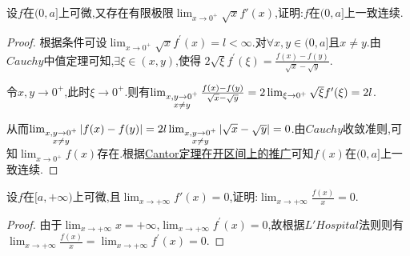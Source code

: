 \documentclass[lang=cn,newtx,10pt,scheme=chinese]{../Template/elegantbook}
\begin{document}
\begin{exercise}
    设\(f\)在\((0,a]\)上可微,又存在有限极限\(\lim_{x \to 0^+} \sqrt{x}f'(x)\),证明:\(f\)在\((0,a]\)上一致连续.
\end{exercise}
\begin{proof}
    根据条件可设\(\lim_{x\rightarrow 0^+} \sqrt{x}f^{\prime}(x)=l<\infty\).对\(\forall x,y\in (0,a]\)且\(x\neq y\).由\(Cauchy\)中值定理可知,\(\exists \xi \in (x,y)\),使得
\(2\sqrt{\xi}f^{\prime}(\xi)=\frac{f(x) - f(y)}{\sqrt{x}-\sqrt{y}}\).

令\(x,y\rightarrow 0^+ \),此时\(\xi \rightarrow 0^+\).则有\(\lim_{\begin{subarray}{c}
x,y\rightarrow 0^+\\
x\neq y
\end{subarray}} \frac{f(x) - f(y)}{\sqrt{x}-\sqrt{y}}=2\lim_{\xi \rightarrow 0^+} \sqrt{\xi}f^{\prime}(\xi)=2l\).

从而\(\lim_{\begin{subarray}{c}
x,y\rightarrow 0^+\\
x\neq y
\end{subarray}} \vert f(x) - f(y)\vert = 2l\lim_{\begin{subarray}{c}
x,y\rightarrow 0^+\\
x\neq y
\end{subarray}} \vert\sqrt{x}-\sqrt{y}\vert = 0\).由\(Cauchy\)收敛准则,可知\(\lim_{x\rightarrow 0^+} f(x)\)存在.根据\hyperref[pro:Cantor定理在开区间上的推广]{Cantor定理在开区间上的推广}可知\(f(x)\)在\((0,a]\)上一致连续.
\end{proof}

\begin{exercise}
    设\(f\)在\([a,+\infty)\)上可微,且\(\lim_{x \to +\infty} f'(x) = 0\),证明:\(\lim_{x \to +\infty} \frac{f(x)}{x} = 0\).
\end{exercise}
\begin{proof}
    由于\(\lim_{x\rightarrow +\infty}x = +\infty\),\(\lim_{x\rightarrow +\infty}f^{\prime}(x) = 0\),故根据\(L'Hospital\)法则则有\(\lim_{x\rightarrow +\infty}\frac{f(x)}{x}=\lim_{x\rightarrow +\infty}f^{\prime}(x) = 0\).
\end{proof}
\end{document}
